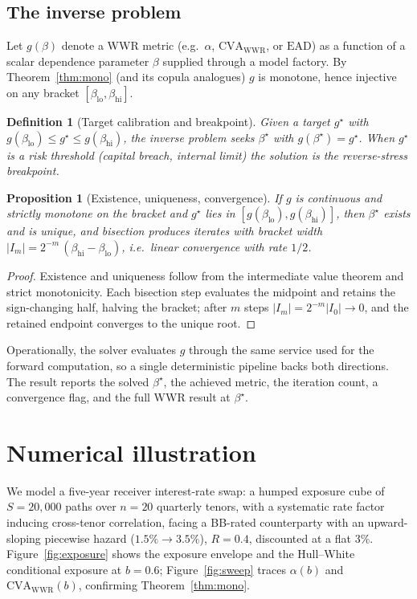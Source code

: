 \documentclass[12pt]{article}
\newtheorem{proposition}{Proposition}
\newtheorem{definition}{Definition}
\newcommand{\CVA}{\mathrm{CVA}}
\newcommand{\EAD}{\mathrm{EAD}}
\begin{document}
\subsection{The inverse problem}
Let $g(\beta)$ denote a WWR metric (e.g.\ $\alpha$, $\CVA_{\text{WWR}}$, or
$\EAD$) as a function of a scalar dependence parameter $\beta$ supplied through a
model factory. By Theorem~\ref{thm:mono} (and its copula analogues) $g$ is
monotone, hence injective on any bracket
$[\beta_{\mathrm{lo}},\beta_{\mathrm{hi}}]$.

\begin{definition}[Target calibration and breakpoint]
Given a target $g^\star$ with
$g(\beta_{\mathrm{lo}})\le g^\star\le g(\beta_{\mathrm{hi}})$, the inverse
problem seeks $\beta^\star$ with $g(\beta^\star)=g^\star$. When $g^\star$ is a
risk \emph{threshold} (capital breach, internal limit) the solution is the
reverse-stress \emph{breakpoint}.
\end{definition}

\begin{proposition}[Existence, uniqueness, convergence]
If $g$ is continuous and strictly monotone on the bracket and $g^\star$ lies in
$[g(\beta_{\mathrm{lo}}),g(\beta_{\mathrm{hi}})]$, then $\beta^\star$ exists and
is unique, and bisection produces iterates with bracket width
$|I_m|=2^{-m}\,(\beta_{\mathrm{hi}}-\beta_{\mathrm{lo}})$, i.e.\ linear
convergence with rate $1/2$.
\end{proposition}
\begin{proof}
Existence and uniqueness follow from the intermediate value theorem and strict
monotonicity. Each bisection step evaluates the midpoint and retains the
sign-changing half, halving the bracket; after $m$ steps
$|I_m|=2^{-m}|I_0|\to0$, and the retained endpoint converges to the unique root.
\end{proof}

Operationally, the solver evaluates $g$ through the same service used for the
forward computation, so a single deterministic pipeline backs both directions.
The result reports the solved $\beta^\star$, the achieved metric, the iteration
count, a convergence flag, and the full WWR result at $\beta^\star$.

\section{Numerical illustration}\label{sec:num}
We model a five-year receiver interest-rate swap: a humped exposure cube of
$S=20{,}000$ paths over $n=20$ quarterly tenors, with a systematic rate factor
inducing cross-tenor correlation, facing a BB-rated counterparty with an
upward-sloping piecewise hazard ($1.5\%\!\to\!3.5\%$), $R=0.4$, discounted at a
flat $3\%$. Figure~\ref{fig:exposure} shows the exposure envelope and the
Hull--White conditional exposure at $b=0.6$; Figure~\ref{fig:sweep} traces
$\alpha(b)$ and $\CVA_{\text{WWR}}(b)$, confirming Theorem~\ref{thm:mono}.
\end{document}
